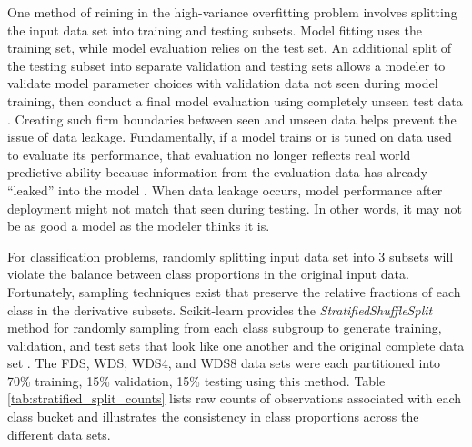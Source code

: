 One method of reining in the high-variance overfitting problem involves splitting the input data set into training and testing subsets. Model fitting uses the training set, while model evaluation relies on the test set. An additional split of the testing subset into separate validation and testing sets allows a modeler to validate model parameter choices with validation data not seen during model training, then conduct a final model evaluation using completely unseen test data \citep[p.\ 222]{hastie_elements_2009}. Creating such firm boundaries between seen and unseen data helps prevent the issue of data leakage. Fundamentally, if a model trains or is tuned on data used to evaluate its performance, that evaluation no longer reflects real world predictive ability because information from the evaluation data has already ``leaked'' into the model \citep{kaufman_leakage_2012}. When data leakage occurs, model performance after deployment might not match that seen during testing. In other words, it may not be as good a model as the modeler thinks it is.

For classification problems, randomly splitting input data set into 3 subsets will violate the balance between class proportions in the original input data. Fortunately, sampling techniques exist that preserve the relative fractions of each class in the derivative subsets. Scikit-learn provides the \textit{StratifiedShuffleSplit} method for randomly sampling from each class subgroup to generate training, validation, and test sets that look like one another and the original complete data set \citep{scikit-learn_sklearnmodel_selectionstratifiedshufflesplit_2021}. The FDS, WDS, WDS4, and WDS8 data sets were each partitioned into 70\% training, 15\% validation, 15\% testing using this method. Table \ref{tab:stratified_split_counts} lists raw counts of observations associated with each class bucket and illustrates the consistency in class proportions across the different data sets.

